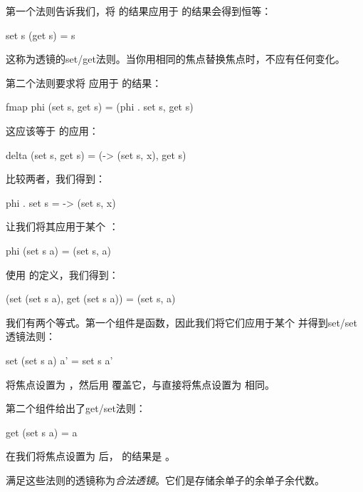 \documentclass[DaoFP]{subfiles}
\begin{document}
第一个法则告诉我们，将  的结果应用于  的结果会得到恒等：
\begin{haskell}
set s (get  s) = s
\end{haskell}
这称为透镜的set/get法则。当你用相同的焦点替换焦点时，不应有任何变化。

第二个法则要求将  应用于  的结果：
\begin{haskell}
fmap phi (set s, get s) = (phi . set s, get s)
\end{haskell}
这应该等于  的应用：
\begin{haskell}
delta (set s, get s) = (\x -> (set s, x), get s)
\end{haskell}
比较两者，我们得到：
\begin{haskell}
phi . set s = \x -> (set s, x)
\end{haskell}
让我们将其应用于某个 ：
\begin{haskell}
phi (set s a) = (set s, a)
\end{haskell}
使用  的定义，我们得到：
\begin{haskell}
(set (set s a), get (set s a)) = (set s, a)
\end{haskell}
我们有两个等式。第一个组件是函数，因此我们将它们应用于某个  并得到set/set透镜法则：
\begin{haskell}
set (set s a) a' = set s a'
\end{haskell}
将焦点设置为 ，然后用  覆盖它，与直接将焦点设置为  相同。

第二个组件给出了get/set法则：
\begin{haskell}
get (set s a) = a
\end{haskell}
在我们将焦点设置为  后， 的结果是 。

满足这些法则的透镜称为\emph{合法透镜}。它们是存储余单子的余单子余代数。
\end{document}
